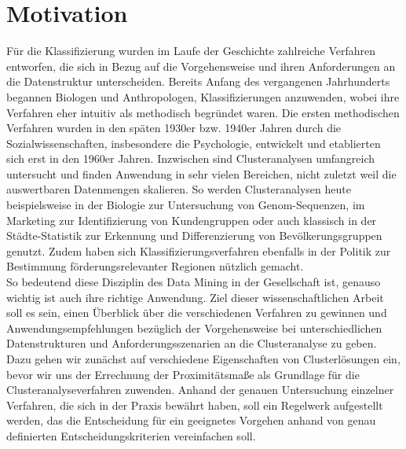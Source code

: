 \chapter{Motivation}

Für die Klassifizierung wurden im Laufe der Geschichte zahlreiche Verfahren entworfen, die sich in Bezug auf die Vorgehensweise und ihren Anforderungen an die Datenstruktur unterscheiden. Bereits Anfang des vergangenen Jahrhunderts begannen Biologen und Anthropologen, Klassifizierungen anzuwenden, wobei ihre Verfahren eher intuitiv als methodisch begründet waren. Die ersten methodischen Verfahren wurden in den späten 1930er bzw. 1940er Jahren durch die Sozialwissenschaften, insbesondere die Psychologie, entwickelt und etablierten sich erst in den 1960er Jahren. Inzwischen sind Clusteranalysen umfangreich untersucht und finden Anwendung in sehr vielen Bereichen, nicht zuletzt weil die auswertbaren Datenmengen skalieren. So werden Clusteranalysen heute beispielsweise in der Biologie zur Untersuchung von Genom-Sequenzen, im Marketing zur Identifizierung von Kundengruppen oder auch klassisch in der Städte-Statistik zur Erkennung und Differenzierung von Bevölkerungsgruppen genutzt. Zudem haben sich Klassifizierungsverfahren ebenfalls in der Politik zur Bestimmung förderungsrelevanter Regionen nützlich gemacht. \\

So bedeutend diese Disziplin des Data Mining in der Gesellschaft ist, genauso wichtig ist auch ihre richtige Anwendung. Ziel dieser wissenschaftlichen Arbeit soll es sein, einen Überblick über die verschiedenen Verfahren zu gewinnen und Anwendungsempfehlungen bezüglich der Vorgehensweise bei unterschiedlichen Datenstrukturen und Anforderungsszenarien an die Clusteranalyse zu geben. \\

Dazu gehen wir zunächst auf verschiedene Eigenschaften von Clusterlösungen ein, bevor wir uns der Errechnung der Proximitätsmaße als Grundlage für die Clusteranalyseverfahren zuwenden.
Anhand der genauen Untersuchung einzelner Verfahren, die sich in der Praxis bewährt haben, soll ein Regelwerk aufgestellt werden, das die Entscheidung für ein geeignetes Vorgehen anhand von genau definierten Entscheidungskriterien vereinfachen soll.